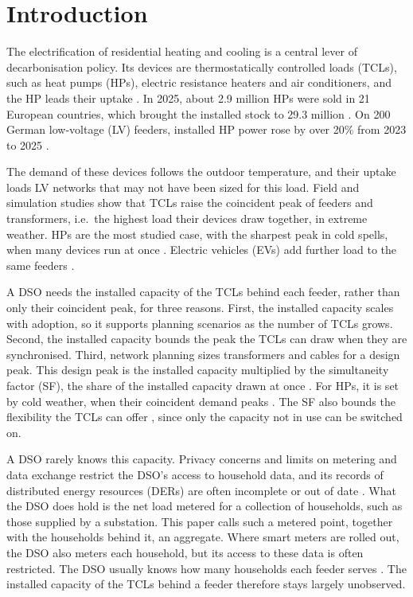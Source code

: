\section{Introduction}
\label{sec:intro}

The electrification of residential heating and cooling is a central lever of decarbonisation policy. Its devices are thermostatically controlled loads (TCLs), such as heat pumps (HPs), electric resistance heaters and air conditioners, and the HP leads their uptake \cite{Iea22}. In 2025, about 2.9 million HPs were sold in 21 European countries, which brought the installed stock to 29.3 million \cite{Ehp26}. On 200 German low-voltage (LV) feeders, installed HP power rose by over 20\% from 2023 to 2025 \cite{Tre26}.

The demand of these devices follows the outdoor temperature, and their uptake loads LV networks that may not have been sized for this load. Field and simulation studies show that TCLs raise the coincident peak of feeders and transformers, i.e.\ the highest load their devices draw together, in extreme weather. HPs are the most studied case, with the sharpest peak in cold spells, when many devices run at once \cite{Vel11, Akm14, Som21, Bec24, Lia26}. Electric vehicles (EVs) add further load to the same feeders \cite{Bec24}.

A DSO needs the installed capacity of the TCLs behind each feeder, rather than only their coincident peak, for three reasons. First, the installed capacity scales with adoption, so it supports planning scenarios as the number of TCLs grows. Second, the installed capacity bounds the peak the TCLs can draw when they are synchronised. Third, network planning sizes transformers and cables for a design peak. This design peak is the installed capacity multiplied by the simultaneity factor (SF), the share of the installed capacity drawn at once \cite{Few24}. For HPs, it is set by cold weather, when their coincident demand peaks \cite{Lov17, Che21b, Rou23}. The SF also bounds the flexibility the TCLs can offer \cite{Mul19, Zir19, Dhu15}, since only the capacity not in use can be switched on.

A DSO rarely knows this capacity. Privacy concerns and limits on metering and data exchange restrict the DSO's access to household data, and its records of distributed energy resources (DERs) are often incomplete or out of date \cite{Gou26}. What the DSO does hold is the net load metered for a collection of households, such as those supplied by a substation. This paper calls such a metered point, together with the households behind it, an aggregate. Where smart meters are rolled out, the DSO also meters each household, but its access to these data is often restricted. The DSO usually knows how many households each feeder serves \cite{Tre26}. The installed capacity of the TCLs behind a feeder therefore stays largely unobserved.

